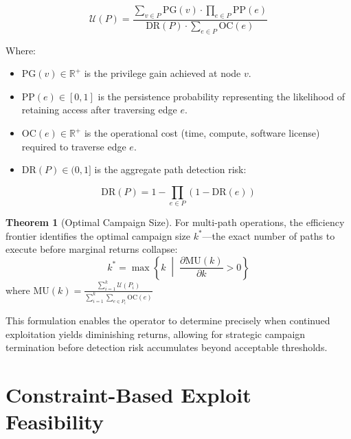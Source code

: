 \documentclass[11pt,a4paper]{article}
\theoremstyle{definition}
\newtheorem{theorem}{Theorem}[section]
\numberwithin{equation}{section}
\newcommand{\set}[1]{\mathcal{#1}}
\newcommand{\R}{\mathbb{R}}
\begin{document}
\begin{equation}\label{eq:path-utility}
\set{U}(P) = \frac{\displaystyle\sum_{v \in P} \text{PG}(v) \cdot \prod_{e \in P} \text{PP}(e)}{\displaystyle\text{DR}(P) \cdot \sum_{e \in P} \text{OC}(e)}
\end{equation}

Where:
\begin{itemize}[leftmargin=2em]
    \item $\text{PG}(v) \in \R^+$ is the privilege gain achieved at node $v$.
    \item $\text{PP}(e) \in [0, 1]$ is the persistence probability representing the likelihood of retaining access after traversing edge $e$.
    \item $\text{OC}(e) \in \R^+$ is the operational cost (time, compute, software license) required to traverse edge $e$.
    \item $\text{DR}(P) \in (0, 1]$ is the aggregate path detection risk:
\end{itemize}

\begin{equation}\label{eq:detection-risk}
\text{DR}(P) = 1 - \prod_{e \in P} (1 - \text{DR}(e))
\end{equation}

\begin{theorem}[Optimal Campaign Size]\label{thm:campaign-size}
For multi-path operations, the efficiency frontier identifies the optimal campaign size $k^*$---the exact number of paths to execute before marginal returns collapse:
\begin{equation}\label{eq:campaign-size}
k^* = \max \left\{ k \;\middle|\; \frac{\partial \text{MU}(k)}{\partial k} > 0 \right\}
\end{equation}
where $\text{MU}(k) = \frac{\sum_{i=1}^k \set{U}(P_i)}{\sum_{i=1}^k \sum_{e \in P_i} \text{OC}(e)}$
\end{theorem}

This formulation enables the operator to determine precisely when continued exploitation yields diminishing returns, allowing for strategic campaign termination before detection risk accumulates beyond acceptable thresholds.

\section{Constraint-Based Exploit Feasibility}\label{sec:feasibility}
\end{document}
